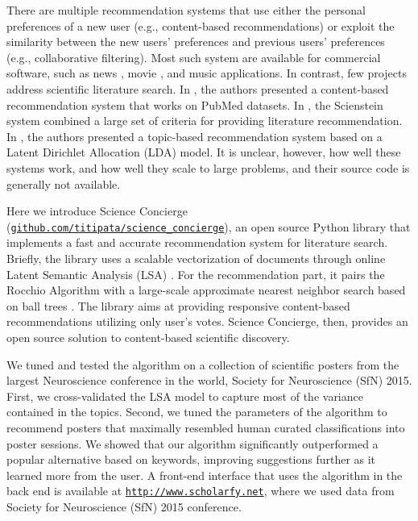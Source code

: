 \documentclass[a4paper]{article}
\begin{document}
There are multiple recommendation systems that use either the personal preferences of a new user (e.g., content-based recommendations) or exploit the similarity between the new users’ preferences and previous users’ preferences (e.g., collaborative filtering). Most such system are available for commercial software, such as news \cite{li2010contextual}, movie \cite{bell2007lessons}, and music \cite{Ali11parallelcollaborative} applications. In contrast, few projects address scientific literature search. In \cite{yoneya2007pure}, the authors presented a content-based recommendation system that works on PubMed datasets. In \cite{gipp2009scienstein}, the Scienstein system combined a large set of criteria for providing literature recommendation. In \cite{wang2011collaborative}, the authors presented a topic-based recommendation system based on a Latent Dirichlet Allocation (LDA) model. It is unclear, however, how well these systems work, and how well they scale to large problems, and their source code is generally not available.


Here we introduce Science Concierge (\href{https://github.com/titipata/science_concierge}{\texttt{github.com/titipata/science\_concierge}}), an open source Python library that implements a fast and accurate recommendation system for literature search. Briefly, the library uses a scalable vectorization of documents through online Latent Semantic Analysis (LSA) \cite{manning2008introduction}. For the recommendation part, it pairs the Rocchio Algorithm \cite{rocchio1971relevance} with a large-scale approximate nearest neighbor search based on ball trees \cite{shakhnarovish2005indyk}. The library aims at providing responsive content-based recommendations utilizing only user’s votes. Science Concierge, then, provides an open source solution to content-based scientific discovery.


We tuned and tested the algorithm on a collection of scientific posters from the largest Neuroscience conference in the world, Society for Neuroscience (SfN) 2015. First, we cross-validated the LSA model to capture most of the variance contained in the topics. Second, we tuned the parameters of the algorithm to recommend posters that maximally resembled human curated classifications into poster sessions. We showed that our algorithm significantly outperformed a popular alternative based on keywords, improving suggestions further as it learned more from the user. A front-end interface that uses the algorithm in the back end is available at \href{http://www.scholarfy.net}{\texttt{http://www.scholarfy.net}}, where we used data from Society for Neuroscience (SfN) 2015 conference.
\end{document}
